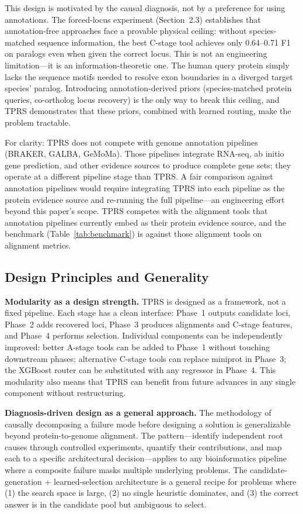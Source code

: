 This design is motivated by the causal diagnosis, not by a preference for using annotations. The forced-locus experiment (Section~2.3) establishes that annotation-free approaches face a provable physical ceiling: without species-matched sequence information, the best C-stage tool achieves only 0.64--0.71 F1 on paralogs even when given the correct locus. This is not an engineering limitation---it is an information-theoretic one. The human query protein simply lacks the sequence motifs needed to resolve exon boundaries in a diverged target species' paralog. Introducing annotation-derived priors (species-matched protein queries, co-ortholog locus recovery) is the only way to break this ceiling, and TPRS demonstrates that these priors, combined with learned routing, make the problem tractable.

For clarity: TPRS does not compete with genome annotation pipelines (BRAKER, GALBA, GeMoMa). Those pipelines integrate RNA-seq, ab initio gene prediction, and other evidence sources to produce complete gene sets; they operate at a different pipeline stage than TPRS. A fair comparison against annotation pipelines would require integrating TPRS into each pipeline as the protein evidence source and re-running the full pipeline---an engineering effort beyond this paper's scope. TPRS competes with the alignment tools that annotation pipelines currently embed as their protein evidence source, and the benchmark (Table~\ref{tab:benchmark}) is against those alignment tools on alignment metrics.

\subsection{Design Principles and Generality}

\textbf{Modularity as a design strength.} TPRS is designed as a framework, not a fixed pipeline. Each stage has a clean interface: Phase~1 outputs candidate loci, Phase~2 adds recovered loci, Phase~3 produces alignments and C-stage features, and Phase~4 performs selection. Individual components can be independently improved: better A-stage tools can be added to Phase~1 without touching downstream phases; alternative C-stage tools can replace miniprot in Phase~3; the XGBoost router can be substituted with any regressor in Phase~4. This modularity also means that TPRS can benefit from future advances in any single component without restructuring.

\textbf{Diagnosis-driven design as a general approach.} The methodology of causally decomposing a failure mode before designing a solution is generalizable beyond protein-to-genome alignment. The pattern---identify independent root causes through controlled experiments, quantify their contributions, and map each to a specific architectural decision---applies to any bioinformatics pipeline where a composite failure masks multiple underlying problems. The candidate-generation + learned-selection architecture is a general recipe for problems where (1) the search space is large, (2) no single heuristic dominates, and (3) the correct answer is in the candidate pool but ambiguous to select.

